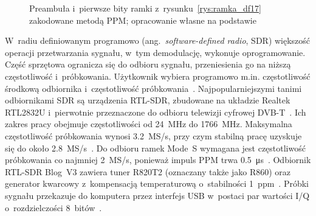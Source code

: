 \begin{figure}[htbp]
  \centering
  \caption{Preambuła i~pierwsze bity ramki z~rysunku~\ref{rys:ramka_df17} zakodowane metodą PPM; opracowanie własne na podstawie~\cite{sun2021}}
  \label{rys:ppm}
\end{figure}

W~radiu definiowanym programowo (ang.~\textit{software-defined radio}, SDR) większość operacji przetwarzania sygnału, w~tym demodulację, wykonuje oprogramowanie. Część sprzętowa ogranicza się do odbioru sygnału, przeniesienia go na niższą częstotliwość i~próbkowania. Użytkownik wybiera programowo m.in. częstotliwość środkową odbiornika i~częstotliwość próbkowania~\cite{sun2021}. Najpopularniejszymi tanimi odbiornikami SDR są urządzenia RTL-SDR, zbudowane na układzie Realtek RTL2832U i~pierwotnie przeznaczone do odbioru telewizji cyfrowej DVB-T~\cite{sun2021,rtlsdrv3}. Ich zakres pracy obejmuje częstotliwości od \SI{24}{\mega\hertz} do \SI{1766}{\mega\hertz}. Maksymalna częstotliwość próbkowania wynosi \SI{3.2}{MS/s}, przy czym stabilną pracę uzyskuje się do około \SI{2.8}{MS/s}~\cite{sun2021}. Do odbioru ramek Mode~S wymagana jest częstotliwość próbkowania co najmniej \SI{2}{MS/s}, ponieważ impuls PPM trwa \SI{0.5}{\micro\second}~\cite{sun2021}. Odbiornik RTL-SDR Blog~V3 zawiera tuner R820T2 (oznaczany także jako R860) oraz generator kwarcowy z~kompensacją temperaturową o~stabilności \SI{1}{ppm}~\cite{rtlsdrv3www}. Próbki sygnału przekazuje do komputera przez interfejs USB w~postaci par wartości I/Q o~rozdzielczości 8~bitów~\cite{dump1090}.

